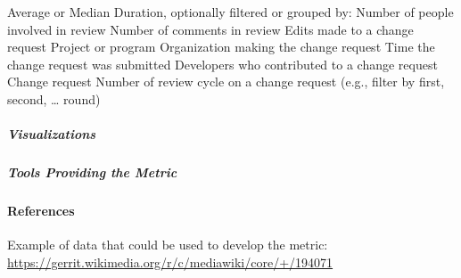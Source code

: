 Average or Median Duration, optionally filtered or grouped by: Number of
people involved in review Number of comments in review Edits made to a
change request Project or program Organization making the change request
Time the change request was submitted Developers who contributed to a
change request Change request Number of review cycle on a change request
(e.g., filter by first, second, \ldots{} round)

\hypertarget{visualizations}{%
\subparagraph{Visualizations}\label{visualizations}}

\hypertarget{tools-providing-the-metric}{%
\subparagraph{Tools Providing the
Metric}\label{tools-providing-the-metric}}

\hypertarget{references}{%
\paragraph{References}\label{references}}

Example of data that could be used to develop the metric:
\href{https://gerrit.wikimedia.org/r/c/mediawiki/core/+/194071}{https://gerrit.wikimedia.org/r/c/mediawiki/core/+/194071}
